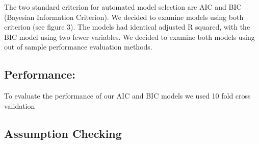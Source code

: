 \documentclass[letterpaper,9pt,twocolumn,twoside,]{pinp}
\begin{document}
The two standard criterion for automated model selection are AIC and BIC
(Bayesian Information Criterion). We decided to examine models using
both criterion (see figure 3). The models had identical adjusted R
squared, with the BIC model using two fewer variables. We decided to
examine both models using out of sample performance evaluation methods.

\hypertarget{performance}{%
\subsection{Performance:}\label{performance}}

To evaluate the performance of our AIC and BIC models we used 10 fold
cross validation

\hypertarget{assumption-checking}{%
\subsection{Assumption Checking}\label{assumption-checking}}
\end{document}
